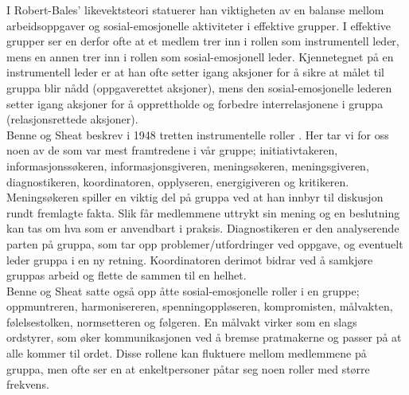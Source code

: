 I Robert-Bales' likevektsteori \cite{jj-bales} statuerer han viktigheten av en balanse mellom
arbeidsoppgaver og sosial-emosjonelle aktiviteter i effektive grupper. I
effektive grupper ser en derfor ofte at et medlem trer inn i rollen som
instrumentell leder, mens en annen trer inn i rollen som sosial-emosjonell
leder. Kjennetegnet på en instrumentell leder er at han ofte setter
igang aksjoner for å sikre at målet til gruppa blir nådd (oppgaverettet
aksjoner), mens den sosial-emosjonelle lederen setter igang aksjoner for å
opprettholde og forbedre interrelasjonene i gruppa (relasjonsrettede
aksjoner).\\


Benne og Sheat beskrev i 1948 tretten instrumentelle roller \cite{svenskeboka}. Her tar vi for
oss noen av de som var mest framtredene i vår gruppe; initiativtakeren,
informasjonssøkeren, informasjonsgiveren, meningsøkeren, meningsgiveren,
diagnostikeren, koordinatoren, opplyseren, energigiveren og kritikeren.
Meningsøkeren spiller en viktig del på gruppa ved at han innbyr til diskusjon
rundt fremlagte fakta. Slik får medlemmene uttrykt sin mening og en beslutning
kan tas om hva som er anvendbart i praksis. Diagnostikeren er den analyserende
parten på gruppa, som tar opp problemer/utfordringer ved oppgave, og eventuelt
leder gruppa i en ny retning. Koordinatoren derimot bidrar ved å samkjøre
gruppas arbeid og flette de sammen til en helhet.\\

Benne og Sheat satte også opp åtte sosial-emosjonelle roller i en gruppe;
oppmuntreren, harmonisereren, spenningoppløseren, kompromisten, målvakten,
følelsestolken, normsetteren og følgeren. En målvakt virker som en slags
ordstyrer, som øker kommunikasjonen ved å bremse pratmakerne og passer på at
alle kommer til ordet. Disse rollene kan fluktuere mellom medlemmene på gruppa,
men ofte ser en at enkeltpersoner påtar seg noen roller med større frekvens.\\
